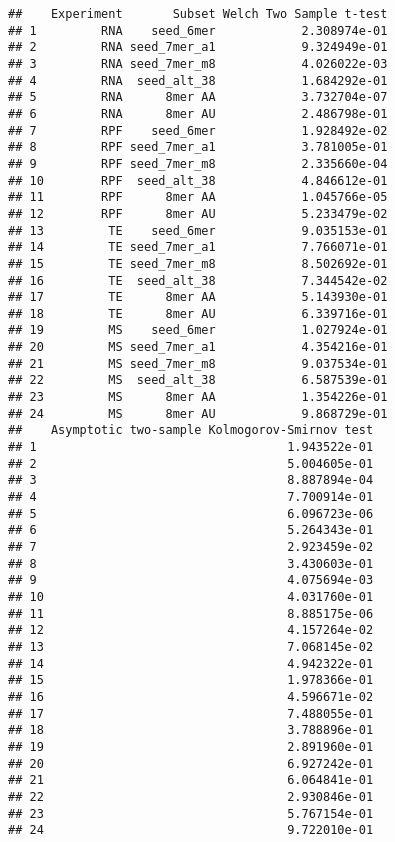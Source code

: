 \documentclass[
]{article}
\begin{document}
\begin{verbatim}
##    Experiment       Subset Welch Two Sample t-test
## 1         RNA    seed_6mer            2.308974e-01
## 2         RNA seed_7mer_a1            9.324949e-01
## 3         RNA seed_7mer_m8            4.026022e-03
## 4         RNA  seed_alt_38            1.684292e-01
## 5         RNA      8mer AA            3.732704e-07
## 6         RNA      8mer AU            2.486798e-01
## 7         RPF    seed_6mer            1.928492e-02
## 8         RPF seed_7mer_a1            3.781005e-01
## 9         RPF seed_7mer_m8            2.335660e-04
## 10        RPF  seed_alt_38            4.846612e-01
## 11        RPF      8mer AA            1.045766e-05
## 12        RPF      8mer AU            5.233479e-02
## 13         TE    seed_6mer            9.035153e-01
## 14         TE seed_7mer_a1            7.766071e-01
## 15         TE seed_7mer_m8            8.502692e-01
## 16         TE  seed_alt_38            7.344542e-02
## 17         TE      8mer AA            5.143930e-01
## 18         TE      8mer AU            6.339716e-01
## 19         MS    seed_6mer            1.027924e-01
## 20         MS seed_7mer_a1            4.354216e-01
## 21         MS seed_7mer_m8            9.037534e-01
## 22         MS  seed_alt_38            6.587539e-01
## 23         MS      8mer AA            1.354226e-01
## 24         MS      8mer AU            9.868729e-01
##    Asymptotic two-sample Kolmogorov-Smirnov test
## 1                                   1.943522e-01
## 2                                   5.004605e-01
## 3                                   8.887894e-04
## 4                                   7.700914e-01
## 5                                   6.096723e-06
## 6                                   5.264343e-01
## 7                                   2.923459e-02
## 8                                   3.430603e-01
## 9                                   4.075694e-03
## 10                                  4.031760e-01
## 11                                  8.885175e-06
## 12                                  4.157264e-02
## 13                                  7.068145e-02
## 14                                  4.942322e-01
## 15                                  1.978366e-01
## 16                                  4.596671e-02
## 17                                  7.488055e-01
## 18                                  3.788896e-01
## 19                                  2.891960e-01
## 20                                  6.927242e-01
## 21                                  6.064841e-01
## 22                                  2.930846e-01
## 23                                  5.767154e-01
## 24                                  9.722010e-01
\end{verbatim}
\end{document}
